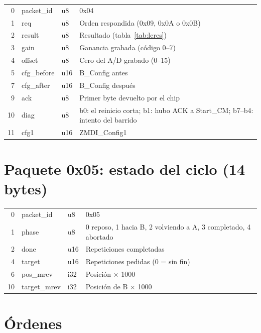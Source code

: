 \noindent\begin{tabularx}{\textwidth}{@{}rllX@{}}
\toprule
0 & packet\_id & u8 & 0x04 \\
1 & req & u8 & Orden respondida (0x09, 0x0A o 0x0B) \\
2 & result & u8 & Resultado (tabla~\ref{tab:lcres}) \\
3 & gain & u8 & Ganancia grabada (código 0--7) \\
4 & offset & u8 & Cero del A/D grabado (0--15) \\
5 & cfg\_before & u16 & B\_Config antes \\
7 & cfg\_after & u16 & B\_Config después \\
9 & ack & u8 & Primer byte devuelto por el chip \\
10 & diag & u8 & b0: el reinicio corta; b1: hubo ACK a Start\_CM; b7--b4: intento del barrido \\
11 & cfg1 & u16 & ZMDI\_Config1 \\
\bottomrule
\end{tabularx}

\section{Paquete 0x05: estado del ciclo (14 bytes)}

\noindent\begin{tabularx}{\textwidth}{@{}rllX@{}}
\toprule
0 & packet\_id & u8 & 0x05 \\
1 & phase & u8 & 0 reposo, 1 hacia B, 2 volviendo a A, 3 completado, 4 abortado \\
2 & done & u16 & Repeticiones completadas \\
4 & target & u16 & Repeticiones pedidas (0 = sin fin) \\
6 & pos\_mrev & i32 & Posición × 1000 \\
10 & target\_mrev & i32 & Posición de B × 1000 \\
\bottomrule
\end{tabularx}

\section{Órdenes}

